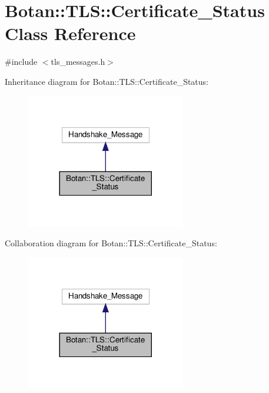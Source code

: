 \hypertarget{class_botan_1_1_t_l_s_1_1_certificate___status}{}\section{Botan\+:\+:T\+LS\+:\+:Certificate\+\_\+\+Status Class Reference}
\label{class_botan_1_1_t_l_s_1_1_certificate___status}


{\ttfamily \#include $<$tls\+\_\+messages.\+h$>$}



Inheritance diagram for Botan\+:\+:T\+LS\+:\+:Certificate\+\_\+\+Status\+:
\nopagebreak
\begin{figure}[H]
\begin{center}
\leavevmode
\includegraphics[width=197pt]{class_botan_1_1_t_l_s_1_1_certificate___status__inherit__graph}
\end{center}
\end{figure}


Collaboration diagram for Botan\+:\+:T\+LS\+:\+:Certificate\+\_\+\+Status\+:
\nopagebreak
\begin{figure}[H]
\begin{center}
\leavevmode
\includegraphics[width=197pt]{class_botan_1_1_t_l_s_1_1_certificate___status__coll__graph}
\end{center}
\end{figure}
